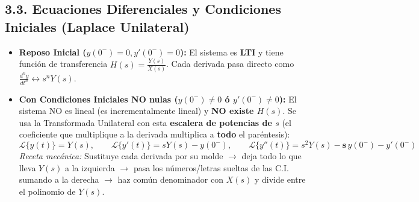 \documentclass[10pt,a4paper]{article}
\begin{document}
	\subsection*{3.3. Ecuaciones Diferenciales y Condiciones Iniciales (Laplace Unilateral)}
	\begin{itemize}
		\item \textbf{Reposo Inicial ($y(0^-)=0, y'(0^-)=0$):} El sistema es \textbf{LTI} y tiene función de transferencia $H(s) = \frac{Y(s)}{X(s)}$. Cada derivada pasa directo como $\frac{d^n y}{dt^n} \leftrightarrow s^n Y(s)$.
		\item \textbf{Con Condiciones Iniciales NO nulas ($y(0^-) \neq 0$ ó $y'(0^-) \neq 0$):} El sistema NO es lineal (es incrementalmente lineal) y \textbf{NO existe $H(s)$}. Se usa la Transformada Unilateral con esta \textbf{escalera de potencias de $s$} (el coeficiente que multiplique a la derivada multiplica a \textbf{todo} el paréntesis):
		$$\mathcal{L}\{y(t)\} = Y(s), \qquad \mathcal{L}\{y'(t)\} = sY(s) - y(0^-), \qquad \mathcal{L}\{y''(t)\} = s^2Y(s) - \mathbf{s}\,y(0^-) - y'(0^-)$$
		\emph{Receta mecánica:} Sustituye cada derivada por su molde $\to$ deja todo lo que lleva $Y(s)$ a la izquierda $\to$ pasa los números/letras sueltas de las C.I. sumando a la derecha $\to$ haz común denominador con $X(s)$ y divide entre el polinomio de $Y(s)$.
	\end{itemize}
	
\end{document}
